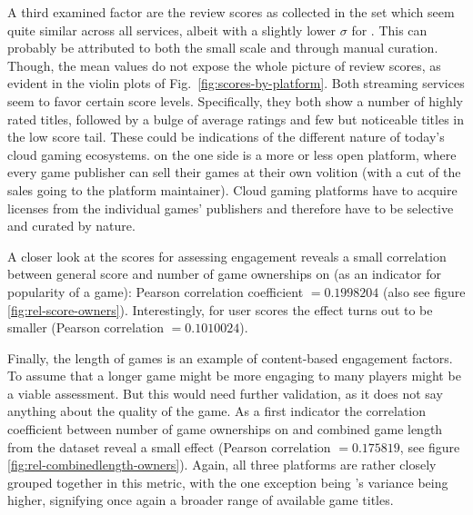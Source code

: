 A third examined factor are the review scores as collected in the \metacritic set which seem quite similar across all services, albeit with a slightly lower $\sigma$ for \gfnow. This can probably be attributed to both the small scale and through manual curation. Though, the mean values do not expose the whole picture of review scores, as evident in the violin plots of Fig.~\ref{fig:scores-by-platform}. Both streaming services seem to favor certain score levels. Specifically, they both show a number of highly rated titles, followed by a bulge of average ratings and few but noticeable titles in the low score tail. These could be indications of the different nature of today's cloud gaming ecosystems. \steam on the one side is a more or less open platform, where every game publisher can sell their games at their own volition (with a cut of the sales going to the platform maintainer). Cloud gaming platforms have to acquire licenses from the individual games' publishers and therefore have to be selective and curated by nature. 

A closer look at the \metacritic scores for assessing engagement reveals a small correlation between general score and number of game ownerships on \steam (as an indicator for popularity of a game): Pearson correlation coefficient $= 0.1998204$ (also see figure \ref{fig:rel-score-owners}). Interestingly, for \metacritic user scores the effect turns out to be smaller (Pearson correlation $= 0.1010024$). 

Finally, the length of games is an example of content-based engagement factors. To assume that a longer game might be more engaging to many players might be a viable assessment. But this would need further validation, as it does not say anything about the quality of the game. As a first indicator the correlation coefficient between number of game ownerships on \steam and combined game length from the \hltb dataset reveal a small effect (Pearson correlation $= 0.175819$, see figure \ref{fig:rel-combinedlength-owners}). Again, all three platforms are rather closely grouped together in this metric, with the one exception being \steam's variance being higher, signifying once again a broader range of available game titles.

